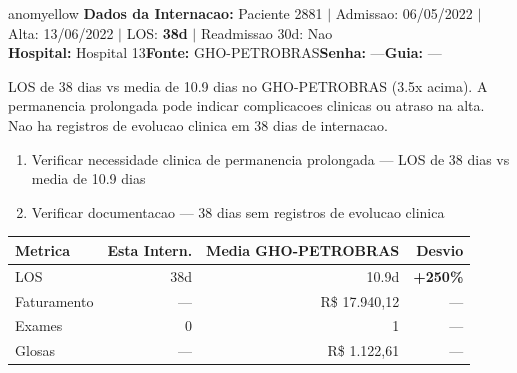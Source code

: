 \documentclass[a4paper,10pt]{article}
\begin{document}
\begin{anomalycard}[Internacao 2420 | GHO-PETROBRAS | MODERADO (z=2.26)]{anomyellow}
\textbf{Dados da Internacao:} Paciente 2881 $\mid$ Admissao: 06/05/2022 $\mid$ Alta: 13/06/2022 $\mid$ LOS: \textbf{38d} $\mid$ Readmissao 30d: Nao\\
\textbf{Hospital:} Hospital 13\quad\textbf{Fonte:} GHO-PETROBRAS\quad\textbf{Senha:} ---\quad\textbf{Guia:} ---\\
\vspace{2pt}\begin{tcolorbox}[colback=severityred!20,colframe=anomyellow,title={\textbf{Interpretacao de Negocio}},fonttitle=\bfseries\small,left=4pt,right=4pt,top=3pt,bottom=3pt]
{\small LOS de 38 dias vs media de 10.9 dias no GHO-PETROBRAS (3.5x acima). A permanencia prolongada pode indicar complicacoes clinicas ou atraso na alta. Nao ha registros de evolucao clinica em 38 dias de internacao.}
\end{tcolorbox}
\begin{tcolorbox}[colback=severityyellow!30,colframe=anomorange,title={\textbf{Recomendacoes Especificas}},fonttitle=\bfseries\small,left=4pt,right=4pt,top=3pt,bottom=3pt]
\begin{enumerate}[nosep,leftmargin=16pt]
\item {\small Verificar necessidade clinica de permanencia prolongada --- LOS de 38 dias vs media de 10.9 dias}
\item {\small Verificar documentacao --- 38 dias sem registros de evolucao clinica}
\end{enumerate}
\end{tcolorbox}
\begin{center}\begin{tabular}{l r r r}\toprule\textbf{Metrica} & \textbf{Esta Intern.} & \textbf{Media GHO-PETROBRAS} & \textbf{Desvio} \\\midrule
LOS & 38d & 10.9d & \textcolor{anomred}{\textbf{+250\%}} \\
Faturamento & --- & R\$ 17.940,12 & --- \\
Exames & 0 & 1 & --- \\
Glosas & --- & R\$ 1.122,61 & --- \\
\bottomrule\end{tabular}\end{center}


\end{anomalycard}
\end{document}
